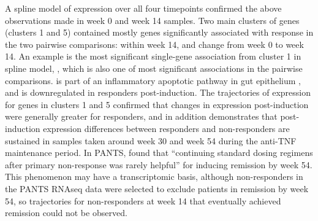 A spline model of expression over all four timepoints confirmed the above observations made in week 0 and week 14 samples.
Two main clusters of genes (clusters 1 and 5) contained mostly genes significantly associated with response in the two pairwise comparisons: 
within week 14, and change from week 0 to week 14.
An example is the most significant single-gene association from cluster 1 in spline model, , 
which is also one of most significant associations in the pairwise comparisons.
 is part of an inflammatory apoptotic pathway in gut epithelium \autocite{laukoetter2008O014IFNGammaInduces}, 
and is downregulated in responders post-induction.
The trajectories of expression for genes in clusters 1 and 5 confirmed that changes in expression post-induction were generally greater for responders,
and in addition demonstrates that post-induction expression differences between responders and non-responders are sustained
in samples taken around week 30 and week 54 during the anti-\gls{TNF} maintenance period.
In \gls{PANTS}, \textcite{kennedy2019PredictorsAntiTNFTreatment} found that \enquote{continuing standard dosing regimens after primary non-response was rarely helpful} for inducing remission by week 54.
This phenomenon may have a transcriptomic basis,
although non-responders in the \gls{PANTS} \gls{RNAseq} data were selected to exclude patients in remission by week 54,
so trajectories for non-responders at week 14 that eventually achieved remission could not be observed.


